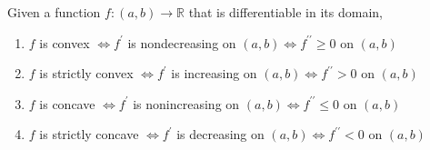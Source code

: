   \begin{theorem}
  Given a function $f: (a, b) \longrightarrow \mathbb{R}$ that is differentiable in its domain, 
  \begin{enumerate}
    \item $f$ is convex $\iff f^\prime$ is nondecreasing on $(a, b) \iff f^{\prime\prime} \geq 0$ on $(a, b)$ 
    \item $f$ is strictly convex $\iff f^\prime$ is increasing on $(a, b) \iff f^{\prime\prime} > 0$ on $(a, b)$ 
    \item $f$ is concave $\iff f^\prime$ is nonincreasing on $(a, b) \iff f^{\prime\prime} \leq 0$ on $(a, b)$ 
    \item $f$ is strictly concave $\iff f^\prime$ is decreasing on $(a, b) \iff f^{\prime\prime} < 0$ on $(a, b)$ 
  \end{enumerate}
  \end{theorem}

